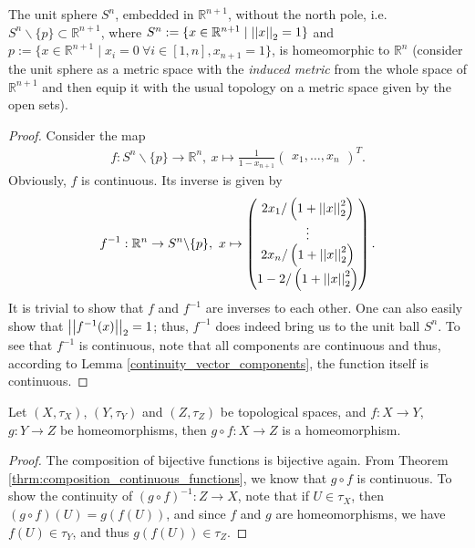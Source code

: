 \begin{exmp}
	The unit sphere $S^n$, embedded in $\mathbb R^{n+1}$, without the north pole, i.e. $S^n\backslash \{p\} \subset \mathbb R^{n+1}$, where $S^n := \{ x\in\mathbb R^{n+1} \mid \left\vert\left\vert x \right\vert\right\vert_{2} = 1 \}$ and $p := \{ x\in\mathbb R^{n+1} \mid x_i = 0 \ \forall i\in[1, n], x_{n+1} = 1 \}$, is homeomorphic to $\mathbb R^n$ (consider the unit sphere as a metric space with the \textit{induced metric} from the whole space of $\mathbb R^{n+1}$ and then equip it with the usual topology on a metric space given by the open sets). 
\end{exmp}
\begin{proof}
	Consider the map 
	\begin{align}
		f: S^n\backslash\{p\}\rightarrow \mathbb R^n, \ x\mapsto \frac{1}{1-x_{n+1}}\begin{pmatrix} x_1, \dots, x_n \end{pmatrix}^T. 
	\end{align}
	Obviously, $f$ is continuous. Its inverse is given by 
	\begin{align}\label{stereographic_map_inverse}
		f^{-1}: \mathbb R^n \rightarrow S^n\backslash\{p\}, \ x\mapsto \begin{pmatrix} 2x_1/ \left(1+\left\vert\left\vert x \right\vert\right\vert_{2}^2\right)\\ \vdots\\ 2x_n/\left(1+\left\vert\left\vert x \right\vert\right\vert_{2}^2\right) \\[4pt] 1-2/\left(1+\left\vert\left\vert x \right\vert\right\vert_{2}^2\right) \end{pmatrix}.  
	\end{align}
	It is trivial to show that $f$ and $f^{-1}$ are inverses to each other. One can also easily show that $\left\vert\left\vert f^{-1}(x) \right\vert\right\vert_{2} = 1$; thus, $f^{-1}$ does indeed bring us to the unit ball $S^n$. 
	To see that $f^{-1}$ is continuous, note that all components are continuous and thus, according to Lemma \ref{continuity_vector_components}, the function itself is continuous. 
\end{proof} 

\begin{theorem}\label{thrm:composition_homeomorphisms}
	Let $(X, \tau_X)$, $(Y, \tau_Y)$ and $(Z, \tau_Z)$ be topological spaces, and $f: X\to Y$, $g: Y\to Z$ be homeomorphisms, then $g\circ f: X\to Z$ is a homeomorphism.
\end{theorem}

\begin{proof}
	The composition of bijective functions is bijective again. From Theorem \ref{thrm:composition_continuous_functions}, we know that $g\circ f$ is continuous. To show the continuity of $(g\circ f)^{-1}: Z\to X$, note that if $U\in\tau_X$, then $(g\circ f)(U) = g(f(U))$, and since $f$ and $g$ are homeomorphisms, we have $f(U)\in \tau_Y$, and thus $g(f(U))\in\tau_Z$.
\end{proof}